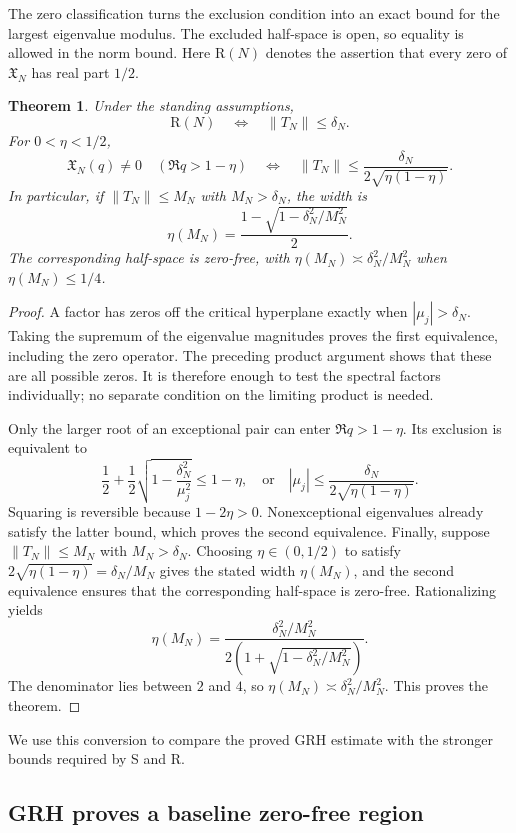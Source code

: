 \documentclass[12pt,a4paper]{amsart}
\numberwithin{equation}{section}
\def\le{\leqslant}
\theoremstyle{plain}
\newtheorem{theorem}{Theorem}[section]
\theoremstyle{definition}
\theoremstyle{remark}
\begin{document}
The zero classification turns the exclusion condition into an exact
bound for the largest eigenvalue modulus. The excluded half-space is
open, so equality is allowed in the norm bound. Here
$\mathrm R(N)$ denotes the assertion that every zero of
$\mathfrak X_N$ has real part $1/2$.

\begin{theorem}\label{proof:qp:dictionary}
Under the standing assumptions,
\[
 \mathrm R(N)\quad\Longleftrightarrow\quad\|T_N\|\le\delta_N.
\]
For $0<\eta<1/2$,
\[
 \mathfrak X_N(q)\ne0\quad(\Re q>1-\eta)
 \quad\Longleftrightarrow\quad
 \|T_N\|\le\frac{\delta_N}{2\sqrt{\eta(1-\eta)}}.
\]
In particular, if $\|T_N\|\le M_N$ with $M_N>\delta_N$, the
width is
\[
 \eta(M_N)=\frac{1-\sqrt{1-\delta_N^2/M_N^2}}2.
\]
The corresponding half-space is zero-free, with $\eta(M_N)\asymp\delta_N^2/M_N^2$
when $\eta(M_N)\le1/4$.
\end{theorem}

\begin{proof}
A factor has zeros off the critical hyperplane exactly when
$|\mu_j|>\delta_N$. Taking the supremum of the eigenvalue magnitudes
proves the first equivalence, including the zero operator.
The preceding product argument shows that these are all possible zeros.
It is therefore enough to test the spectral factors individually; no
separate condition on the limiting product is needed.

Only the larger root of an exceptional pair can enter
$\Re q>1-\eta$. Its exclusion is equivalent to
\[
 \frac12+\frac12\sqrt{1-\frac{\delta_N^2}{\mu_j^2}}\le1-\eta,
 \quad\text{or}\quad
 |\mu_j|\le\frac{\delta_N}{2\sqrt{\eta(1-\eta)}}.
\]
Squaring is reversible because $1-2\eta>0$. Nonexceptional eigenvalues
already satisfy the latter bound, which proves the second equivalence.
Finally, suppose $\|T_N\|\le M_N$ with $M_N>\delta_N$.
Choosing $\eta\in(0,1/2)$ to satisfy
$2\sqrt{\eta(1-\eta)}=\delta_N/M_N$ gives the stated width
$\eta(M_N)$, and the second equivalence ensures that the
corresponding half-space is zero-free. Rationalizing yields
\[
 \eta(M_N)=\frac{\delta_N^2/M_N^2}
 {2\left(1+\sqrt{1-\delta_N^2/M_N^2}\right)}.
\]
The denominator lies between $2$ and $4$, so
$\eta(M_N)\asymp\delta_N^2/M_N^2$.
This proves the theorem.
\end{proof}

We use this conversion to compare the proved GRH estimate with the
stronger bounds required by S and R.

\subsection{GRH proves a baseline zero-free region}
\label{proof:sec:grh-bound}
\end{document}

